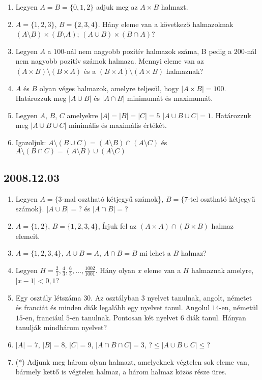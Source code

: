 \documentclass{article}
\begin{document}
\begin{enumerate}
\item Legyen $A{=}B{=}\{0,1,2\}$ adjuk meg az $A{\times}B$ halmazt.

\item $A{=}\{1,2,3\}$, $B{=}\{2,3,4\}$. Hány eleme van a következő halmazoknak $(A{\setminus}B){\times}(B{\setminus}A)$; $(A{\cup}B){\times}(B{\cap}A)$?

\item Legyen $A$ a $100$-nál nem nagyobb pozitív halmazok száma, B pedig a $200$-nál nem nagyobb pozitív számok halmaza. Mennyi eleme van  az $(A{\times}B){\setminus}(B{\times}A)$ és a $(B{\times}A){\setminus}(A{\times}B)$ halmaznak?

\item $A$ és $B$ olyan véges halmazok, amelyre teljesül, hogy $|A{\times}B|{=}100$. Határozzuk meg $|A{\cup}B|$ és $|A{\cap}B|$ minimumát és maximumát.

\item Legyen $A$, $B$, $C$ amelyekre $|A|{=}|B|{=}|C|{=}5$ $|A{\cup}B{\cup}C|{=}1$. Határozzuk meg $|A{\cup}B{\cup}C|$ minimális és maximális értékét.

\item  Igazoljuk: $A{\setminus}(B{\cup}C){=}(A{\setminus}B){\cap}(A{\setminus}C)$ és $A{\setminus}(B{\cap}C){=}(A{\setminus}B){\cup}(A{\setminus}C)$
\end{enumerate}

\subsection*{2008.12.03}
\begin{enumerate}
\item Legyen $A{=}\{3$-mal osztható kétjegyű számok\}, $B{=}\{7$-tel osztható kétjegyű számok\}. $|A{\cup}B|{=}$? és $|A{\cap}B|{=}$?

\item $A{=}\{1,2\}$, $B{=}\{1,2,3,4\}$, Írjuk fel az $(A{\times}A){\cap}(B{\times}B)$ halmaz elemeit.

\item $A{=}\{1,2,3,4\}$, $A{\cup}B{=}A$, $A{\cap}B{=}B$ mi lehet a $B$ halmaz?

\item Legyen $H{=}{\frac{2}{1}, \frac{4}{3}, \frac{6}{5}, {\ldots}, \frac{1002}{1001}}$. Hány olyan $x$ eleme van a $H$ halmaznak amelyre, $|x-1|<0,1$?

\item Egy osztály létszáma $30$. Az osztályban $3$ nyelvet tanulnak, angolt, németet és franciát és minden diák legalább egy nyelvet tanul. Angolul $14$-en, németül $15$-en, franciául $5$-en tanulnak. Pontosan két  nyelvet $6$ diák tanul. Hányan tanulják mindhárom nyelvet?

\item $|A|{=}7$, $|B|{=}8$, $|C|{=}9$, $|A{\cap}B{\cap}C|{=}3$,  ?${\le} |A{\cup}B{\cup}C|{\le}$?

\item ($*$) Adjunk meg három olyan halmazt, amelyeknek végtelen sok eleme van, bármely kettő is végtelen halmaz, a három halmaz közös része üres.
\end{enumerate}
\end{document}
